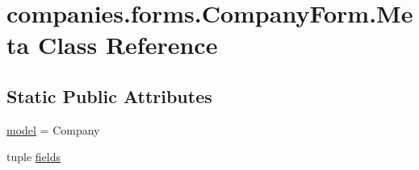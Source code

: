 \hypertarget{classcompanies_1_1forms_1_1_company_form_1_1_meta}{\section{companies.\-forms.\-Company\-Form.\-Meta Class Reference}
\label{classcompanies_1_1forms_1_1_company_form_1_1_meta}
}
\subsection*{Static Public Attributes}
\begin{DoxyCompactItemize}
\item 
\hyperlink{classcompanies_1_1forms_1_1_company_form_1_1_meta_a8d3f48c3b4d80e9f0dc8b1a508982fc5}{model} = Company
\item 
tuple \hyperlink{classcompanies_1_1forms_1_1_company_form_1_1_meta_ac528327dbb0844a0517728c7a865b527}{fields}
\end{DoxyCompactItemize}


